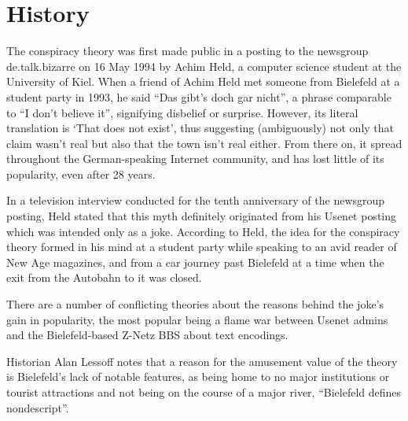 \section{History}

The conspiracy theory was first made public in a posting to the newsgroup de.talk.bizarre on 16 May 1994 by Achim Held, a computer science student at the University of Kiel. When a friend of Achim Held met someone from Bielefeld at a student party in 1993, he said \enquote{Das gibt's doch gar nicht}, a phrase comparable to \enquote{I don't believe it}, signifying disbelief or surprise. However, its literal translation is \enquote*{That does not exist}, thus suggesting (ambiguously) not only that claim wasn't real but also that the town isn't real either. From there on, it spread throughout the German-speaking Internet community, and has lost little of its popularity, even after 28 years.

In a television interview conducted for the tenth anniversary of the newsgroup posting, Held stated that this myth definitely originated from his Usenet posting which was intended only as a joke. According to Held, the idea for the conspiracy theory formed in his mind at a student party while speaking to an avid reader of New Age magazines, and from a car journey past Bielefeld at a time when the exit from the Autobahn to it was closed.

There are a number of conflicting theories about the reasons behind the joke's gain in popularity, the most popular being a flame war between Usenet admins and the Bielefeld-based Z-Netz BBS about text encodings.

Historian Alan Lessoff notes that a reason for the amusement value of the theory is Bielefeld's lack of notable features, as being home to no major institutions or tourist attractions and not being on the course of a major river, \enquote{Bielefeld defines nondescript}.
